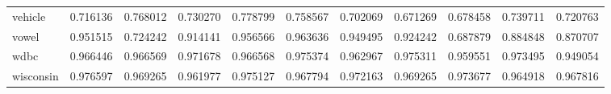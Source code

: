 \begin{tabular}{lrrrrrrrrrr}
vehicle         &   0.716136 &  0.768012 &  0.730270 &  0.778799 &  0.758567 &  0.702069 &  0.671269 &  0.678458 &  0.739711 &  0.720763 \\
vowel           &   0.951515 &  0.724242 &  0.914141 &  0.956566 &  0.963636 &  0.949495 &  0.924242 &  0.687879 &  0.884848 &  0.870707 \\
wdbc            &   0.966446 &  0.966569 &  0.971678 &  0.966568 &  0.975374 &  0.962967 &  0.975311 &  0.959551 &  0.973495 &  0.949054 \\
wisconsin       &   0.976597 &  0.969265 &  0.961977 &  0.975127 &  0.967794 &  0.972163 &  0.969265 &  0.973677 &  0.964918 &  0.967816 \\
\bottomrule
\end{tabular}
